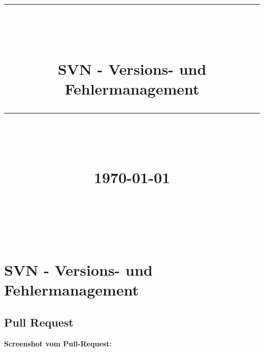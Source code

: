 \documentclass[12pt]{article}
\newcommand{\HRule}[1]{\rule{\linewidth}{#1}}
\begin{document}
\hypersetup{
    citecolor=black,
    filecolor=black,
    linkcolor=black,
    urlcolor=black
}


\title{ \normalsize
		\HRule{0.5pt} \\
		\LARGE \textbf{\uppercase{\newCommandDiscipline}} \\
    \smallbreak
    \small\textbf{{SVN - Versions- und Fehlermanagement}}\\
		\HRule{2pt} \\ [0.5cm]
    \small\textbf{{\newCommandTerm}}\\
    [0.5cm]
    \normalsize \today \vspace*{10\baselineskip}}

\date{}



\author{
    \newCommandName \\
		\newCommandMatriculationNumber \\
		\newCommandUniversity \\
		\newCommandFaculty
}


\maketitle
\thispagestyle{empty}

\newpage
\pagestyle{myfancy}
\tableofcontents
\newpage

\sectionfont{\scshape}

\section{SVN - Versions- und Fehlermanagement}

\subsection{Pull Request}

\textbf{Screenshot vom Pull-Request:}
\end{document}
